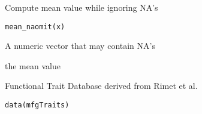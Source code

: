 \documentclass[a4paper]{book}
\begin{document}
%
\begin{Description}\relax
Compute mean value while ignoring NA's
\end{Description}
%
\begin{Usage}
\begin{verbatim}
mean_naomit(x)
\end{verbatim}
\end{Usage}
%
\begin{Arguments}
\begin{ldescription}
\item[\code{x}] A numeric vector that may contain NA's
\end{ldescription}
\end{Arguments}
%
\begin{Value}
the mean value
\end{Value}
%
\begin{Examples}
\end{Examples}
%
\begin{Description}\relax
Functional Trait Database derived from Rimet et al.
\end{Description}
%
\begin{Usage}
\begin{verbatim}
data(mfgTraits)
\end{verbatim}
\end{Usage}
%
\end{document}
